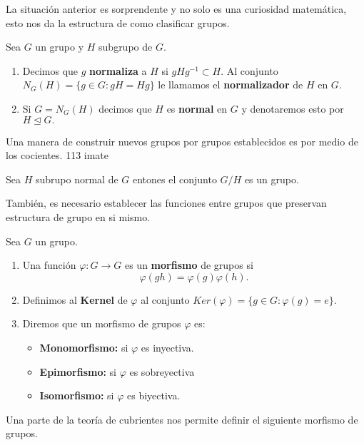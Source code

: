 	La situación anterior es sorprendente y no solo es una curiosidad matemática, esto nos da la estructura de como clasificar grupos. 
	
\begin{df}
	Sea $G$ un grupo y $H$ subgrupo de $G$.
\begin{enumerate}
	\item  Decimos que $g$ \textbf{normaliza} a $H$ si $gHg^{-1} \subset H.$ Al conjunto $N_G(H)=\{g \in G: gH=Hg\}$ le llamamos el \textbf{normalizador } de $H$ en $G$.
	\item Si $G=N_G(H)$ decimos que $H$ es \textbf{normal} en $G$ y denotaremos esto por $H \unlhd G.$
		
\end{enumerate}
\end{df}
	
	Una manera de construir nuevos grupos por grupos establecidos es por medio de los cocientes. 	113 imate
	
	\begin{te}
	Sea $H$ subrupo normal de  $G$ entones el conjunto $G/H$ es un grupo.
	\end{te}
	
	También, es necesario establecer las funciones entre grupos que preservan estructura de grupo en si mismo.
	
	\begin{df}
	Sea $G$ un grupo. 
	\begin{enumerate}
	\item Una función $\varphi:G \to G$ es un \textbf{morfismo} de grupos si $$\varphi(gh)=\varphi(g) \varphi(h).$$
	\item Definimos al \textbf{Kernel} de $\varphi$ al conjunto $Ker(\varphi)=\{ g \in G: \varphi(g)=e\}$.
	\item Diremos que un morfismo de grupos $\varphi$ es:
	\begin{itemize}
	\item \textbf{Monomorfismo:} si $\varphi$ es inyectiva.
	\item \textbf{Epimorfismo:} si $\varphi$ es sobreyectiva
	\item \textbf{Isomorfismo:} si $\varphi$ es biyectiva.
	\end{itemize}
	\end{enumerate}				\end{df}
	
Una parte de la teoría de cubrientes nos permite definir el siguiente morfismo de grupos.

